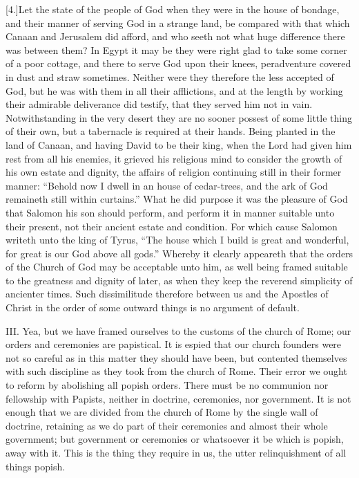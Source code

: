 [4.]Let the state of the people of God when they were in the house of bondage, and their manner of serving God in a strange land, be compared with that which Canaan and Jerusalem did afford, and who seeth not what huge difference there was between them? In Egypt it may be they were right glad to take some corner of a poor cottage, and there to serve God upon their knees, peradventure covered in dust and straw sometimes. Neither were they therefore the less accepted of God, but he was with them in all their afflictions, and at the length by working their admirable deliverance did testify, that they served him not in vain. Notwithstanding in the very desert they are no sooner possest of some little thing of their own, but a tabernacle is required at their hands. Being planted in the land of Canaan, and having David to be their king, when the Lord had given him rest from all his enemies, it grieved his religious mind to consider the growth of his own estate and dignity, the affairs of religion continuing  still in their former manner: “Behold now I dwell in an house of cedar-trees, and the ark of God remaineth still within curtains.” What he did purpose it was the pleasure of God that Salomon his son should perform, and perform it in manner suitable unto their present, not their ancient estate and condition. For which cause Salomon writeth unto the king of Tyrus, “The house which I build is great and wonderful, for great is our God above all gods.” Whereby it clearly appeareth that the orders of the Church of God may be acceptable unto him, as well being framed suitable to the greatness and dignity of later, as when they keep the reverend simplicity of ancienter times. Such dissimilitude therefore between us and the Apostles of Christ in the order of some outward things is no argument of default.

III. Yea, but we have framed ourselves to the customs of the church of Rome; our orders and ceremonies are papistical. It is espied that our church founders were not so careful as in this matter they should have been, but contented themselves with such discipline as they took from the church of Rome. Their error we ought to reform by abolishing all popish orders. There must be no communion nor fellowship with Papists, neither in doctrine, ceremonies, nor government. It is not enough that we are divided from the church of Rome by the single wall of doctrine, retaining as we do part of their ceremonies and almost their whole government; but government or ceremonies or whatsoever it be which is popish, away with it. This is the thing they require in us, the utter relinquishment of all things popish.

